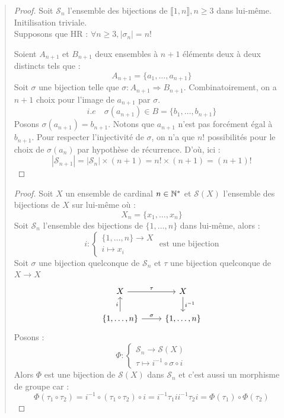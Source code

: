 \begin{quote}
	\footnotesize
	\begin{proof}
		Soit $\mathcal{S}_n$ l'ensemble des bijections de $\llbracket 1,n \rrbracket, n \geq 3$ dans lui-même.
		Initilisation triviale. \\
		Supposons que HR : $ \forall n \geq 3, | \sigma_n | = n ! $

		Soient $A_{n+1}$ et $B_{n+1}$ deux ensembles à $n+1$ éléments deux à deux distincts tels que :
			\[ A_{n+1} = \{a_1, \dots, a_{n+1} \} \]
		Soit $\sigma$ une bijection telle que $ \sigma : A_{n+1} \Longrightarrow B_{n+1}$.
		Combinatoirement, on a $n+1$ choix pour l'image de $a_{n+1}$ par $\sigma$.
			\[ i.e \quad \sigma(a_{n+1}) \in B = \{b_1, \dots, b_{n+1} \} \]
		Posons $ \sigma(a_{n+1}) = b_{n+1}$. Notons que $a_{n+1}$ n'est pas forcément égal à $b_{n+1}$.
		Pour respecter l'injectivité de $\sigma$, on n'a que $n !$ possibilités pour le choix de $\sigma(a_n)$ par hypothèse de récurrence.
		D'où, ici :
			\[ |\mathcal{S}_{n+1}| = |\mathcal{S}_n| \times (n+1) = n! \times (n+1) = (n+1)! \]
	\end{proof}
	\begin{proof}
		Soit $X$ un ensemble de cardinal $n \in \mathbb{N}^*$ et $\mathcal{S}(X)$ l'ensemble des bijections de $X$ sur lui-même où :
			\[ X_n = \{x_1, \dots, x_n \} \]
		Soit $\mathcal{S}_n$ l'ensemble des bijections de $\{1, \dots, n\}$ dans lui-même, alors :
			\[ i :  
				\begin{cases}
					\{1,\dots,n\} \longrightarrow X \\
					i \longmapsto x_i 
				\end{cases}  \text{ est une bijection} \]
		Soit $\sigma$ une bijection quelconque de $\mathcal{S}_n$ et $\tau$ une bijection quelconque de $ X \longrightarrow X$ 
		$$
		\begin{tikzcd}
			X \arrow[r, "\tau"]
				& X \arrow[d, "i^{-1}"] \\
			\{1,\dots,n\} \arrow[r, "\sigma"] \arrow[u, "i"] 
				& \{1,\dots,n\}
		\end{tikzcd}
		$$
		Posons :
				\[ \Phi : 
					\begin{cases}
						\mathcal{S}_n \longrightarrow \mathcal{S}(X) \\
						\tau \longmapsto i^{-1} \circ \sigma \circ i 
					\end{cases} \]
		Alors $\Phi$ est une bijection de $\mathcal{S}(X)$ dans $\mathcal{S}_n$ et c'est aussi un morphisme de groupe car :
					\[ \Phi(\tau_1 \circ \tau_2) = i^{-1} \circ (\tau_1 \circ \tau_2) \circ i = i^{-1} \tau_1 i i^{-1} \tau_2 i = \Phi(\tau_1) \circ \Phi(\tau_2) \]
	\end{proof}
	\normalsize
\end{quote}

